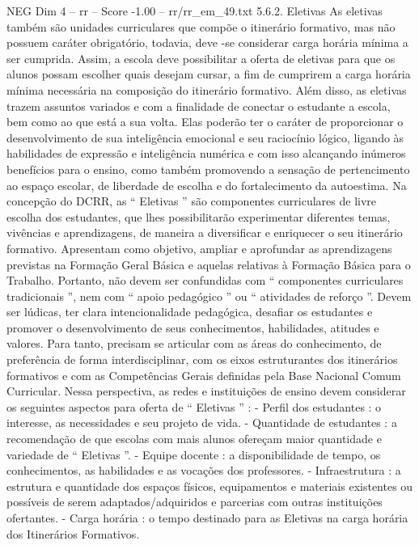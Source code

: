 \begin{textsample}{NEG Dim 4 – rr – Score -1.00 – rr/rr\_em\_49.txt}  \label{ex:f4_neg_180}
5.6.2.
Eletivas As eletivas também são unidades curriculares que compõe o itinerário formativo, mas não possuem caráter obrigatório, todavia, deve -se considerar carga horária mínima a ser cumprida.
Assim, a escola deve possibilitar a oferta de eletivas para que os alunos possam escolher quais desejam cursar, a fim de cumprirem a carga horária mínima necessária na composição do itinerário formativo.
Além disso, as eletivas trazem assuntos variados e com a finalidade de conectar o estudante a escola, bem como ao que está a sua volta.
Elas poderão ter o caráter de proporcionar o desenvolvimento de sua inteligência emocional e seu raciocínio lógico, ligando às habilidades de expressão e inteligência numérica e com isso alcançando inúmeros benefícios para o ensino, como também promovendo a sensação de pertencimento ao espaço escolar, de liberdade de escolha e do fortalecimento da autoestima.
Na concepção do DCRR, as “ Eletivas ” são componentes curriculares de livre escolha dos estudantes, que lhes possibilitarão experimentar diferentes temas, vivências e aprendizagens, de maneira a diversificar e enriquecer o seu itinerário formativo.
Apresentam como objetivo, ampliar e aprofundar as aprendizagens previstas na Formação Geral Básica e aquelas relativas à Formação Básica para o Trabalho.
Portanto, não devem ser confundidas com “ componentes curriculares tradicionais ”, nem com “ apoio pedagógico ” ou “ atividades de reforço ”.
Devem ser lúdicas, ter clara intencionalidade pedagógica, desafiar os estudantes e promover o desenvolvimento de seus conhecimentos, habilidades, atitudes e valores.
Para tanto, precisam se articular com as áreas do conhecimento, de preferência de forma interdisciplinar, com os eixos estruturantes dos itinerários formativos e com as Competências Gerais definidas pela Base Nacional Comum Curricular.
Nessa perspectiva, as redes e instituições de ensino devem considerar os seguintes aspectos para oferta de “ Eletivas ” : - Perfil dos estudantes : o interesse, as necessidades e seu projeto de vida. - Quantidade de estudantes : a recomendação de que escolas com mais alunos ofereçam maior quantidade e variedade de “ Eletivas ”. - Equipe docente : a disponibilidade de tempo, os conhecimentos, as habilidades e as vocações dos professores. - Infraestrutura : a estrutura e quantidade dos espaços físicos, equipamentos e materiais existentes ou possíveis de serem adaptados/adquiridos e parcerias com outras instituições ofertantes. - Carga horária : o tempo destinado para as Eletivas na carga horária dos Itinerários Formativos.

\end{textsample}
